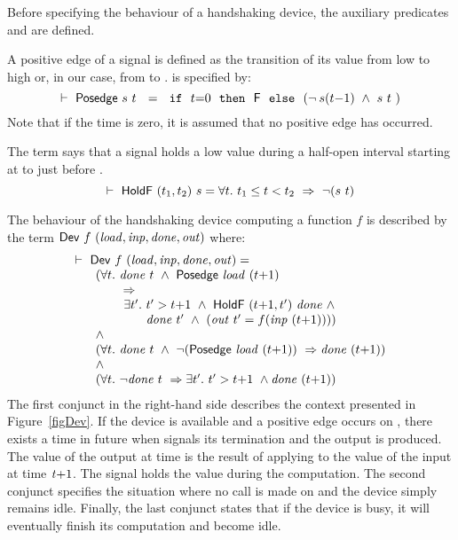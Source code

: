 Before specifying the behaviour of a handshaking device,
the auxiliary predicates  and  are defined.

A positive edge of a signal is defined as the transition of its
value from low to high or, in our case, from  to . 
 is specified by:
\[
\TURNST\ \DEF{Posedge}\ s\ t~ ~=~~ \IF{~t{=}0~}{~\DEF{F}~}{~(\NOT\hspace*{0.8mm} s(t{-}1)\ \AND\ s\ t~})
\]
Note that if the time is zero, it is assumed that no positive edge has
occurred.

The term  says that a
signal  holds a low value  during a half-open interval
starting at  to just before .
\[
\TURNST\ \DEF{HoldF}\ (t_1,t_2)\ s = \forall t.\ t_1 \leq t < t_2\ \IMP\ \NOT(s\ t)
\]

The behaviour of the handshaking device computing a function $f$ is described by the term 
$\DEF{Dev}\ f\ \VAR{(load,inp,done,out)}$ where:
\[
\begin{array}{l}
\TURNST\ \DEF{Dev}\ f\ \VAR{(load,inp,done,out)} = \\
~~\quad     (\forall t.\ \VAR{done}\ t\ \AND\ \DEF{Posedge}\ \VAR{load}\ (t{+}1)\ \\
\phantom{~~\quad     (\forall t.~} \IMP \\
\phantom{~~\quad     (\forall t.\ ~ } \exists t'.\ t' > t{+}1\ \AND\ \DEF{HoldF}\ (t{+}1,t')\ \VAR{done}\ \AND \\
\phantom{~~\quad     (\forall t.\ ~ \exists t'.\ }  \VAR{done}\ t'\ \AND\ (\VAR{out}\ t' = f (\VAR{inp}\ (t{+}1))))\ \\
~~\quad  \AND \\
~~\quad (\forall t.\ \VAR{done}\ t\ \AND\ \NOT(\DEF{Posedge}\ \VAR{load}\ (t{+}1))\ \IMP  \VAR{done}\ (t{+}1))\\
~~\quad  \AND \\
~~\quad (\forall t.\ \NOT\VAR{done}\ t\ \IMP \exists t'.\ t' > t{+}1\ \AND \VAR{done}\ (t{+}1))\\
\end{array}
\]
The first conjunct in the right-hand side describes the context presented
in Figure~\ref{figDev}. If the device is available and a positive
edge occurs on , there exists a time  in future
when  signals its termination and the output is produced.
The value of the output at time  is the result
of applying  to the value of the input at time $\mathit{t}{+}1$.
The signal  holds the value  during the computation.
The second conjunct specifies the situation where no call
is made on  and the device simply remains idle.
Finally, the last conjunct states that if the device
is busy, it will eventually finish its computation
and become idle.

